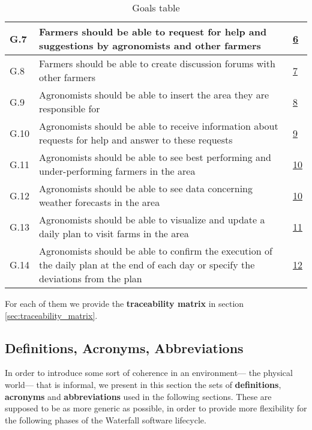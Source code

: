 \begin{table}[H]
\begin{tabular}{|l|m{}|l|}
        \hline
        G.7                                               &     Farmers should be able to request for help and suggestions by agronomists and other farmers &   \hyperref[sec:farmersNeeds]{6} \\
        \hline
        G.8                                              &   Farmers should be able to create discussion forums with other farmers     &   \hyperref[sec:farmersNeeds]{7} \\
        \hline
        G.9                                  &   Agronomists should be able to insert the area they are responsible for   &   \hyperref[sec:agronomistsNeeds]{8} \\
        \hline
        G.10                                                      &  Agronomists should be able to receive information about requests for help and answer to these requests   &    \hyperref[sec:agronomistsNeeds]{9}\\%
        \hline
        G.11                                               &     Agronomists should be able to see best performing and under-performing farmers in the area &   \hyperref[sec:agronomistsNeeds]{10} \\
        \hline
        G.12                                              &   Agronomists should be able to see data concerning weather forecasts in the area     &   \hyperref[sec:agronomistsNeeds]{10} \\
        \hline
        G.13                                               &     Agronomists should be able to visualize and update a daily plan to visit farms in the area &   \hyperref[sec:agronomistsNeeds]{11} \\
        \hline
        G.14                                              &   Agronomists should be able to confirm the execution of the daily plan at the end of each day or specify the deviations from the plan     &   \hyperref[sec:agronomistsNeeds]{12} \\
        \hline
    \end{tabular}
    
    \caption{\label{tab:goals}Goals table}
\end{table}


For each of them we provide the \textbf{traceability matrix} in section \ref{sec:traceability_matrix}.

\subsection{Definitions, Acronyms, Abbreviations}
\label{sec:def_acr_abr}
In order to introduce some sort of coherence in an environment--- the physical world--- that is informal, we present in this section the sets of \textbf{definitions}, \textbf{acronyms} and \textbf{abbreviations} used in the following sections. These are supposed to be as more generic as possible, in order to provide more flexibility for the following phases of the Waterfall software lifecycle.

